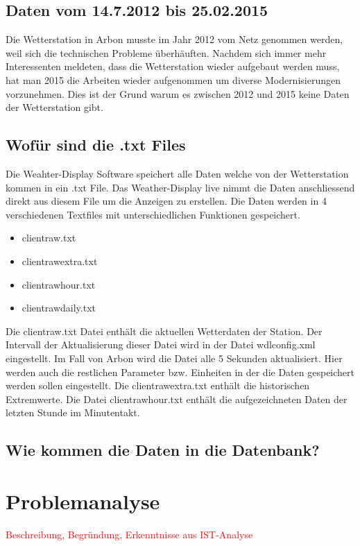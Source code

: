 \documentclass[a4paper,ngerman, 11pt, pagesize]{report}
\newcommand\Diskussionspunkt[1]{\textcolor{red}{#1}}
\begin{document}
\subsection{Daten vom 14.7.2012 bis 25.02.2015}
Die Wetterstation in Arbon musste im Jahr 2012 vom Netz genommen werden, weil sich die technischen Probleme überhäuften. Nachdem sich immer mehr Interessenten meldeten, dass die Wetterstation wieder aufgebaut werden muss, hat man 2015 die Arbeiten wieder aufgenommen um diverse Modernisierungen vorzunehmen. Dies ist der Grund warum es zwischen 2012 und 2015 keine Daten der Wetterstation gibt. ~\cite{Felix:ErweiterteHorizonte}

\subsection{Wofür sind die .txt Files}
Die Weahter-Display Software speichert alle Daten welche von der Wetterstation kommen in ein .txt File. Das Weather-Display live nimmt die Daten anschliessend direkt aus diesem File um die Anzeigen zu erstellen. Die Daten werden in 4 verschiedenen Textfiles mit unterschiedlichen Funktionen gespeichert.
\begin{itemize}  
\item clientraw.txt
\item clientrawextra.txt
\item clientrawhour.txt
\item clientrawdaily.txt
\end{itemize}

Die clientraw.txt Datei enthält die aktuellen Wetterdaten der Station. Der Intervall der Aktualisierung dieser Datei wird in der Datei wdlconfig.xml eingestellt. Im Fall von Arbon wird die Datei alle 5 Sekunden aktualisiert.  Hier werden auch die restlichen Parameter bzw. Einheiten in der die Daten gespeichert werden sollen eingestellt. Die clientrawextra.txt enthält die historischen Extremwerte. Die Datei clientrawhour.txt enthält die aufgezeichneten Daten der letzten Stunde im Minutentakt.\cite{WeatherDisplay}


\subsection{Wie kommen die Daten in die Datenbank?}

  

\section{Problemanalyse}
\Diskussionspunkt{Beschreibung, 
Begründung, 
Erkenntnisse aus IST-Analyse}
\end{document}
